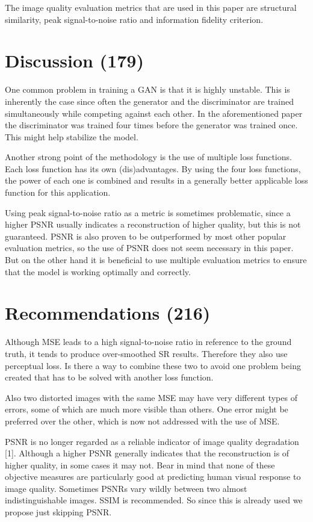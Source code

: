 \documentclass[conference]{IEEEtran}
\begin{document}
The image quality evaluation metrics that are used in this paper are structural
similarity, peak signal-to-noise ratio and information fidelity criterion.

\section{Discussion (179)}
One common problem in training a GAN is that it is highly unstable. This is
inherently the case since often the generator and the discriminator are trained
simultaneously while competing against each other. In the aforementioned paper
the discriminator was trained four times before the generator was trained once.
This might help stabilize the model.

Another strong point of the methodology is the use of multiple loss functions.
Each loss function has its own (dis)advantages. By using the four loss
functions, the power of each one is combined and results in a generally better
applicable loss function for this application.

Using peak signal-to-noise ratio as a metric is sometimes problematic, since a
higher PSNR usually indicates a reconstruction of higher quality, but this is
not guaranteed. PSNR is also proven to be outperformed by most other popular
evaluation metrics, so the use of PSNR does not seem necessary in this paper.
But on the other hand it is beneficial to use multiple evaluation metrics to
ensure that the model is working optimally and correctly.

\section{Recommendations (216)}
Although MSE leads to a high signal-to-noise ratio in reference to the ground
truth, it tends to produce over-smoothed SR results. Therefore they also use
perceptual loss. Is there a way to combine these two to avoid one problem being
created that has to be solved with another loss function.

Also two distorted images with the same MSE may have very different types of
errors, some of which are much more visible than others. One error might be
preferred over the other, which is now not addressed with the use of MSE.

PSNR is no longer regarded as a reliable indicator of image quality degradation
[1]. Although a higher PSNR generally indicates that the reconstruction is of
higher quality, in some cases it may not. Bear in mind that none of these
objective measures are particularly good at predicting human visual response to
image quality. Sometimes PSNRs vary wildly between two almost indistinguishable
images. SSIM is recommended. So since this is already used we propose just
skipping PSNR.
\end{document}
